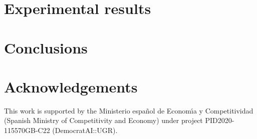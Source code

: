 \documentclass[a4paper,twoside]{article}
\begin{document}
\section{Experimental results}
\label{sec:res}

\section{Conclusions}
\label{sec:conc}

\section*{Acknowledgements}

This work is supported by the Ministerio espa\~{n}ol de Econom\'{\i}a y
Competitividad (Spanish Ministry of Competitivity and Economy) under project
PID2020-115570GB-C22 (DemocratAI::UGR).



{\small
}
\end{document}
